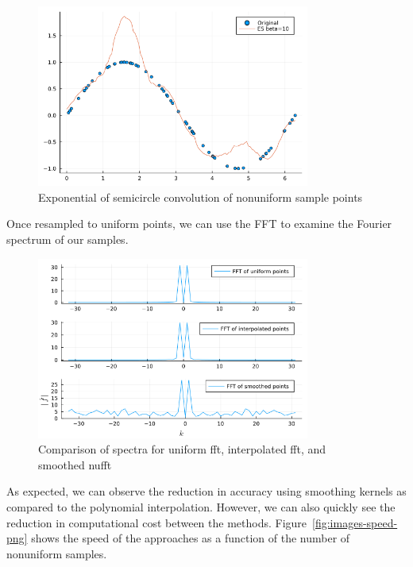 \begin{figure}[htpb]
    \centering
    \includegraphics[width=0.8\textwidth]{images/es.png}
    \caption{Exponential of semicircle convolution of nonuniform sample points}
    \label{fig:images-es-png}
\end{figure}

Once resampled to uniform points, we can use the FFT to examine the Fourier spectrum of our samples.

\begin{figure}[htpb]
    \centering
    \includegraphics[width=0.8\textwidth]{images/fft_comparison.png}
    \caption{Comparison of spectra for uniform fft, interpolated fft, and smoothed nufft}
    \label{fig:images-fft-png}
\end{figure}

As expected, we can observe the reduction in accuracy using smoothing kernels as compared to the polynomial interpolation.
However, we can also quickly see the reduction in computational cost between the methods.
Figure~\ref{fig:images-speed-png} shows the speed of the approaches as a function of the number of nonuniform samples.

